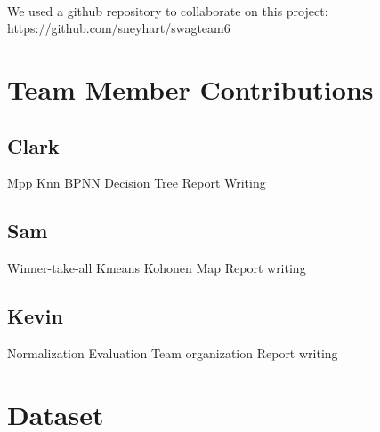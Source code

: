 \documentclass{article}
\begin{document}

\paragraph{} 
We used a github repository to collaborate on this project:
\newline
https://github.com/sneyhart/swagteam6
\newpage


\section*{Team Member Contributions}
\subsection*{Clark}
\newline
\indent Mpp
\newline Knn
\newline BPNN
\newline Decision Tree
\newline Report Writing
\newline
\subsection*{Sam}
\newline
\indent Winner-take-all
\newline Kmeans
\newline Kohonen Map
\newline Report writing
\subsection*{Kevin}
\newline
\indent Normalization
\newline Evaluation
\newline Team organization
\newline Report writing
\newpage


\section*{Dataset}
\end{document}

